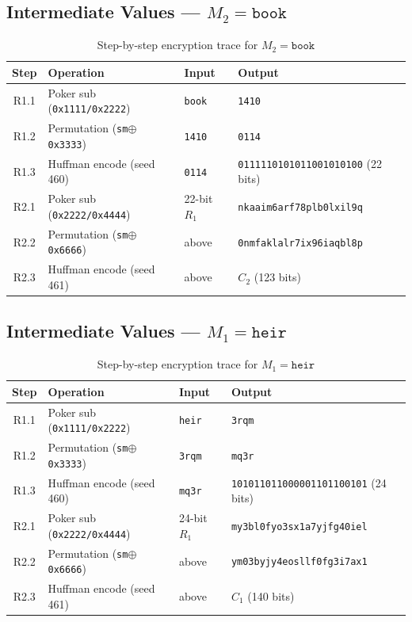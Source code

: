 \documentclass[12pt,a4paper]{article}
\begin{document}
\subsection{Intermediate Values — $M_2 = \texttt{book}$}

\begin{table}[H]
\centering
\caption{Step-by-step encryption trace for $M_2 = \texttt{book}$}
\begin{tabular}{clll}
\toprule
\textbf{Step} & \textbf{Operation} & \textbf{Input} & \textbf{Output} \\
\midrule
R1.1 & Poker sub (\texttt{0x1111/0x2222}) & \texttt{book} & \texttt{1410} \\
R1.2 & Permutation (\texttt{sm}$\oplus$\texttt{0x3333}) & \texttt{1410} & \texttt{0114} \\
R1.3 & Huffman encode (seed 460) & \texttt{0114} & \texttt{0111110101011001010100} (22 bits) \\
R2.1 & Poker sub (\texttt{0x2222/0x4444}) & 22-bit $R_1$ & \texttt{nkaaim6arf78plb0lxil9q} \\
R2.2 & Permutation (\texttt{sm}$\oplus$\texttt{0x6666}) & above & \texttt{0nmfaklalr7ix96iaqbl8p} \\
R2.3 & Huffman encode (seed 461) & above & $C_2$ (123 bits) \\
\bottomrule
\end{tabular}
\end{table}

\subsection{Intermediate Values — $M_1 = \texttt{heir}$}

\begin{table}[H]
\centering
\caption{Step-by-step encryption trace for $M_1 = \texttt{heir}$}
\begin{tabular}{clll}
\toprule
\textbf{Step} & \textbf{Operation} & \textbf{Input} & \textbf{Output} \\
\midrule
R1.1 & Poker sub (\texttt{0x1111/0x2222}) & \texttt{heir} & \texttt{3rqm} \\
R1.2 & Permutation (\texttt{sm}$\oplus$\texttt{0x3333}) & \texttt{3rqm} & \texttt{mq3r} \\
R1.3 & Huffman encode (seed 460) & \texttt{mq3r} & \texttt{101011011000001101100101} (24 bits) \\
R2.1 & Poker sub (\texttt{0x2222/0x4444}) & 24-bit $R_1$ & \texttt{my3bl0fyo3sx1a7yjfg40iel} \\
R2.2 & Permutation (\texttt{sm}$\oplus$\texttt{0x6666}) & above & \texttt{ym03byjy4eosllf0fg3i7ax1} \\
R2.3 & Huffman encode (seed 461) & above & $C_1$ (140 bits) \\
\bottomrule
\end{tabular}
\end{table}
\end{document}
